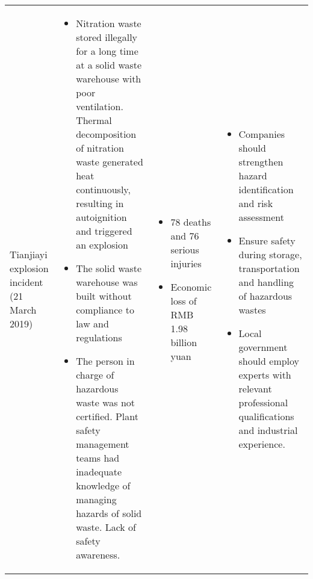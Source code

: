 {\begin{tabular}{@{}p{3cm}p{8cm}p{4cm}p{7cm}@{}}
Tianjiayi explosion incident (21 March 2019)                                                     & \begin{itemize}[leftmargin=1em]\item Nitration waste stored illegally for a long time at a solid waste warehouse with poor ventilation. Thermal decomposition of nitration waste generated heat continuously, resulting in autoignition and triggered an explosion\item The solid waste warehouse was built without compliance to law and regulations\item The person in charge of hazardous waste was not certified. Plant safety management teams had inadequate knowledge of managing hazards of solid waste. Lack of safety awareness.\end{itemize}                                                                                                                                                                                     & \begin{itemize}[leftmargin=1em]\item 78 deaths and 76 serious injuries \item Economic loss of RMB 1.98 billion yuan\end{itemize}                                                                                                                                                                      & \begin{itemize}[leftmargin=1em]\item Companies should strengthen hazard identification and risk assessment \item Ensure safety during storage, transportation and handling of hazardous wastes\item Local government should employ experts with relevant professional qualifications and industrial experience.\end{itemize}                                                                                                                                                                                                                                                                                            \\

\end{tabular}}
